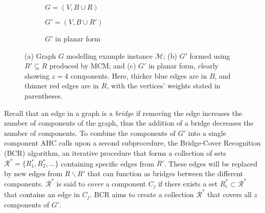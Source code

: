 \documentclass[authoryear]{elsarticle}
\begin{document}
\begin{figure}[H]	
	\centering
	\begin{subfigure}[h]{0.33\textwidth}
		
		\caption{$G = (V, B \cup R)$}
		\label{fig:threshold}
	\end{subfigure} \hspace{5mm}
	\begin{subfigure}[h]{0.33\textwidth}
		
		\caption{$G' = (V, B \cup R')$}
		\label{fig:matching}
	\end{subfigure} \hspace{7mm}
	\begin{subfigure}[h]{0.2\textwidth}
		
		\caption{$G'$ in planar form}
		\label{fig:mps}
	\end{subfigure}
	\caption{(a) Graph $G$ modelling example instance $\mathcal{M}$; (b) $G'$ formed using $R' \subseteq R$ produced by MCM; and (c) $G'$ in planar form, clearly showing $z = 4$ components. Here, thicker blue edges are in $B$, and thinner red edges are in $R$, with the vertices' weights stated in parentheses.}
	\label{fig:mcm}
\end{figure}

\noindent Recall that an edge in a graph is a \emph{bridge} if removing the edge increases the number of components of the graph, thus the addition of a bridge decreases the number of components. To combine the components of $G'$ into a single component AHC calls upon a second subprocedure, the Bridge-Cover Recognition (BCR) algorithm, an iterative procedure that forms a collection of sets $\mathcal{R}^* = \{R^*_1, R^*_2, \dots\}$ containing specific edges from $R'$. These edges will be replaced by new edges from $R\backslash R'$ that can function as bridges between the different components. $\mathcal{R}^*$ is said to \emph{cover} a component $C_j$ if there exists a set $R^*_i \subset \mathcal{R}^*$ that contains an edge in $C_j$. BCR aims to create a collection $\mathcal{R}^*$ that covers all $z$ components of $G'$.
\end{document}
